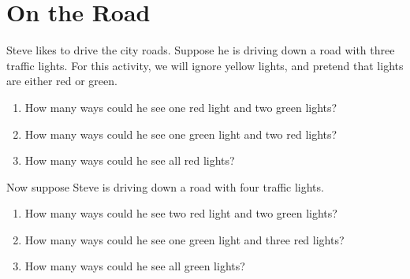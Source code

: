 \newpage
\section{On the Road}\label{A:traffic}


\begin{prob} 
Steve likes to drive the city roads. Suppose he is driving down a road
with three traffic lights. For this activity, we will ignore yellow
lights, and pretend that lights are either red or green.
\begin{enumerate}
\item How many ways could he see one red light and two green lights?
\item How many ways could he see one green light and two red lights?
\item How many ways could he see all red lights?
\end{enumerate}
\end{prob}

\begin{prob} 
Now suppose Steve is driving down a road with four traffic lights.
\begin{enumerate}
\item How many ways could he see two red light and two green lights?
\item How many ways could he see one green light and three red lights?
\item How many ways could he see all green lights?
\end{enumerate}
\end{prob}

